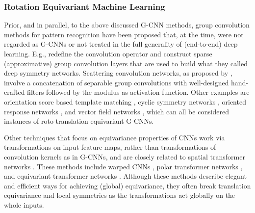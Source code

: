 \documentclass[twocolumn,final]{article}
\begin{document}
\subsubsection{Rotation Equivariant Machine Learning}
Prior, and in parallel, to the above discussed G-CNN methods, group convolution methods for pattern recognition have been proposed that, at the time, were not regarded as G-CNNs or not treated in the full generality of (end-to-end) deep learning. E.g., \citet{gens2014deep} redefine the convolution operator and construct sparse (approximative) group convolution layers that are used to build what they called deep symmetry networks. Scattering convolution networks, as proposed by \citet{mallat_group_2012}, involve a concatenation of separable group convolutions with well-designed hand-crafted filters followed by the modulus as activation function. Other examples are orientation score based template matching \citep{bekkers_training_2015}, cyclic symmetry networks \citep{dieleman2016exploiting}, oriented response networks \citep{zhou_oriented_2017}, and vector field networks \citep{marcos_rotation_2017}, which can all be considered instances of roto-translation equivariant G-CNNs.

Other techniques that focus on equivariance properties of CNNs work via transformations on input feature maps, rather than transformations of convolution kernels as in G-CNNs, and are closely related to spatial transformer networks \citep{jaderberg_spatial_2015}. These methods include warped CNNs \citep{henriques2017warped}, polar transformer networks \citep{esteves_polar_2018}, and equivariant transformer networks \citep{tai_equivariant_2019}. Although these methods describe elegant and efficient ways for achieving (global) equivariance, they often break translation equivariance and local symmetries as the transformations act globally on the whole inputs.
\end{document}
